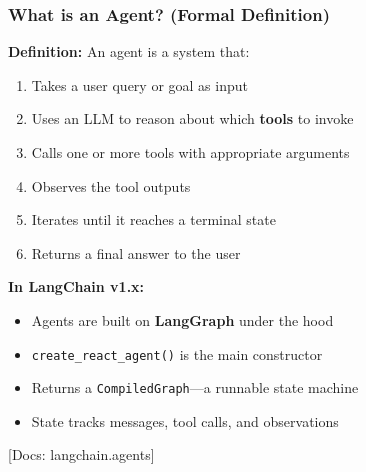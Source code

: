 \documentclass[aspectratio=169,11pt]{beamer}
\newcommand{\docref}[1]{{\scriptsize\color{docgray}[Docs: #1]}}
\begin{document}
\begin{frame}
\frametitle{What is an Agent? (Formal Definition)}

\textbf{Definition:} An agent is a system that:

\vspace{0.3cm}

\begin{enumerate}
  \item Takes a user query or goal as input
  \item Uses an LLM to reason about which \textbf{tools} to invoke
  \item Calls one or more tools with appropriate arguments
  \item Observes the tool outputs
  \item Iterates until it reaches a terminal state
  \item Returns a final answer to the user
\end{enumerate}

\vspace{0.5cm}

\textbf{In LangChain v1.x:}
\begin{itemize}
  \item Agents are built on \textbf{LangGraph} under the hood
  \item \texttt{create\_react\_agent()} is the main constructor
  \item Returns a \texttt{CompiledGraph}—a runnable state machine
  \item State tracks messages, tool calls, and observations
\end{itemize}

\docref{langchain.agents}

\end{frame}
\end{document}
